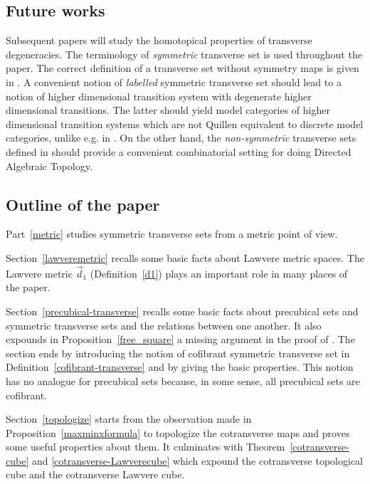 \documentclass[a4paper,12pt]{amsart}
\renewcommand{\vec}{\overrightarrow}
\theoremstyle{definition}
\newcommand{\vd}{\vec{d}\!_1}
\begin{document}
\subsection*{Future works} 

Subsequent papers will study the homotopical properties of transverse degeneracies. The terminology of \textit{symmetric} transverse set is used throughout the paper. The correct definition of a transverse set without symmetry maps is given in \cite{ThickCubes}. A convenient notion of \textit{labelled} symmetric transverse set should lead to a notion of higher dimensional transition system with degenerate higher dimensional transitions. The latter should yield model categories of higher dimensional transition systems which are not Quillen equivalent to discrete model categories, unlike e.g. in \cite[Theorem~7.5]{pastsim}. On the other hand, the \textit{non-symmetric} transverse sets defined in \cite{ThickCubes} should provide a convenient combinatorial setting for doing Directed Algebraic Topology.


\subsection*{Outline of the paper}

Part~\ref{metric} studies symmetric transverse sets from a metric point of view. 

Section~\ref{lawveremetric} recalls some basic facts about Lawvere metric spaces. The Lawvere metric $\vd$ (Definition~\ref{d1}) plays an important role in many places of the paper. 

Section~\ref{precubical-transverse} recalls some basic facts about precubical sets and symmetric transverse sets and the relations between one another. It also expounds in Proposition~\ref{free_square} a missing argument in the proof of \cite[Corollary~2.2.11]{symcub}. The section ends by introducing the notion of cofibrant symmetric transverse set in Definition~\ref{cofibrant-transverse} and by giving the basic properties. This notion has no analogue for precubical sets because, in some sense, all precubical sets are cofibrant. 

Section~\ref{topologize} starts from the observation made in Proposition~\ref{maxminxformula} to topologize the cotransverse maps and proves some useful properties about them. It culminates with Theorem~\ref{cotransverse-cube} and  \ref{cotransverse-Lawverecube} which expound the cotransverse topological cube and the cotransverse Lawvere cube.
\end{document}
